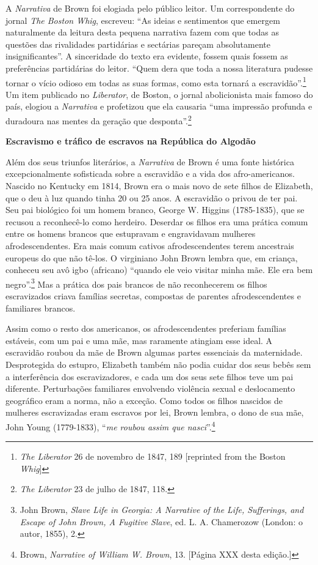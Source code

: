 A \emph{Narrativa} de Brown foi elogiada pelo público leitor. Um
correspondente do jornal \emph{The Boston Whig}, escreveu: ``As ideias e
sentimentos que emergem naturalmente da leitura desta pequena narrativa
fazem com que todas as questões das rivalidades partidárias e sectárias
pareçam absolutamente insignificantes''. A sinceridade do texto era
evidente, fossem quais fossem as preferências partidárias do leitor.
``Quem dera que toda a nossa literatura pudesse tornar o vício odioso em
todas as suas formas, como esta tornará a escravidão''.\footnote{\emph{The
  Liberator} 26 de novembro de 1847, 189 {[}reprinted from the Boston
  \emph{Whig}{]}} Um item publicado no \emph{Liberator}, de Boston, o
jornal abolicionista mais famoso do país, elogiou a \emph{Narrativa} e
profetizou que ela causaria ``uma impressão profunda e duradoura nas
mentes da geração que desponta''.\footnote{\emph{The Liberator} 23 de
  julho de 1847, 118.}

\textbf{Escravismo e tráfico de escravos na República do Algodão}

Além dos seus triunfos literários, a \emph{Narrativa} de Brown é uma
fonte histórica excepcionalmente sofisticada sobre a escravidão e a vida
dos afro-americanos. Nascido no Kentucky em 1814, Brown era o mais novo
de sete filhos de Elizabeth, que o deu à luz quando tinha 20 ou 25 anos.
A escravidão o privou de ter pai. Seu pai biológico foi um homem branco,
George W. Higgins (1785-1835), que se recusou a reconhecê-lo como
herdeiro. Deserdar os filhos era uma prática comum entre os homens
brancos que estupravam e engravidavam mulheres afrodescendentes. Era
mais comum cativos afrodescendentes terem ancestrais europeus do que não
tê-los. O virginiano John Brown lembra que, em criança, conheceu seu avô
igbo (africano) ``quando ele veio visitar minha mãe. Ele era bem
negro''.\footnote{John Brown, \emph{Slave Life in Georgia: A Narrative
  of the Life, Sufferings, and Escape of John Brown, A Fugitive Slave},
  ed. L. A. Chamerozow (London: o autor, 1855), 2.} Mas a prática dos
pais brancos de não reconhecerem os filhos escravizados criava famílias
secretas, compostas de parentes afrodescendentes e familiares brancos.

Assim como o resto dos americanos, os afrodescendentes preferiam
famílias estáveis, com um pai e uma mãe, mas raramente atingiam esse
ideal. A escravidão roubou da mãe de Brown algumas partes essenciais da
maternidade. Desprotegida do estupro, Elizabeth também não podia cuidar
dos seus bebês sem a interferência dos escravizadores, e cada um dos
seus sete filhos teve um pai diferente. Perturbações familiares
envolvendo violência sexual e deslocamento geográfico eram a norma, não
a exceção. Como todos os filhos nascidos de mulheres escravizadas eram
escravos por lei, Brown lembra, o dono de sua mãe, John Young
(1779-1833), ``\emph{me roubou assim que nasci}''.\footnote{Brown,
  \emph{Narrative of William W. Brown}, 13. {[}Página XXX desta
  edição.{]}}

